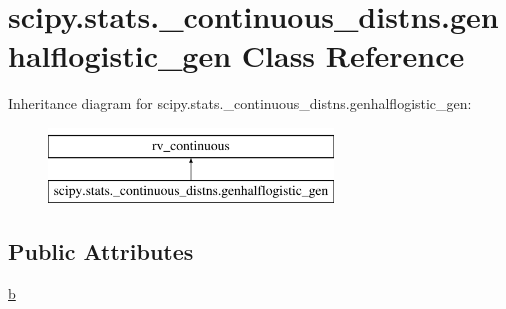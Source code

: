 \hypertarget{classscipy_1_1stats_1_1__continuous__distns_1_1genhalflogistic__gen}{}\section{scipy.\+stats.\+\_\+continuous\+\_\+distns.\+genhalflogistic\+\_\+gen Class Reference}
\label{classscipy_1_1stats_1_1__continuous__distns_1_1genhalflogistic__gen}
Inheritance diagram for scipy.\+stats.\+\_\+continuous\+\_\+distns.\+genhalflogistic\+\_\+gen\+:\begin{figure}[H]
\begin{center}
\leavevmode
\includegraphics[height=2.000000cm]{classscipy_1_1stats_1_1__continuous__distns_1_1genhalflogistic__gen}
\end{center}
\end{figure}
\subsection*{Public Attributes}
\begin{DoxyCompactItemize}
\item 
\hyperlink{classscipy_1_1stats_1_1__continuous__distns_1_1genhalflogistic__gen_a05b7b6087cdd2ca5e5d7aa7f84e2db9a}{b}
\end{DoxyCompactItemize}


